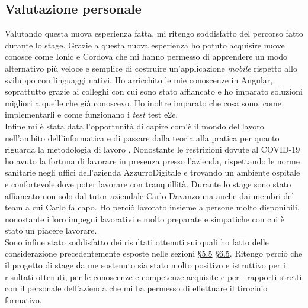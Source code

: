 \subsection{Valutazione personale}
Valutando questa nuova esperienza fatta, mi ritengo soddisfatto del percorso fatto durante lo stage. Grazie a questa nuova esperienza ho potuto acquisire nuove conosce come Ionic e Cordova che mi hanno permesso di apprendere un modo alternativo più veloce e semplice di costruire un’applicazione \emph{mobile} rispetto allo sviluppo con linguaggi nativi. Ho arricchito le mie conoscenze in Angular, soprattutto grazie ai colleghi con cui sono stato affiancato e ho imparato soluzioni migliori a quelle che già conoscevo. Ho inoltre imparato che cosa sono, come implementarli e come funzionano i \emph{test} \gls{test e2e}.\\
Infine mi è stata data l'opportunità di capire com'è il mondo del lavoro nell'ambito dell'informatica e di passare dalla teoria alla pratica per quanto riguarda la metodologia di lavoro .
Nonostante le restrizioni dovute al COVID-19 ho avuto la fortuna di lavorare in presenza presso l'azienda, rispettando le norme sanitarie negli uffici dell'azienda AzzurroDigitale e trovando un ambiente ospitale e confortevole dove poter lavorare con tranquillità.
Durante lo stage sono stato affiancato non solo dal tutor aziendale Carlo Davanzo ma anche dai membri del team a cui Carlo fa capo. Ho perciò lavorato insieme a persone molto disponibili, nonostante i loro impegni lavorativi e molto preparate e simpatiche con cui è stato un piacere lavorare. \\

Sono infine stato soddisfatto dei risultati ottenuti sui quali ho fatto delle considerazione precedentemente esposte nelle sezioni \hyperref[cap:cons1]{§5.5} \hyperref[cap:cons2]{§6.5}.
Ritengo perciò che il progetto di stage da me sostenuto sia stato molto positivo e istruttivo per i risultati ottenuti, per le conoscenze e competenze acquisite e per i rapporti stretti con il personale dell'azienda che mi ha permesso di effettuare il tirocinio formativo.
